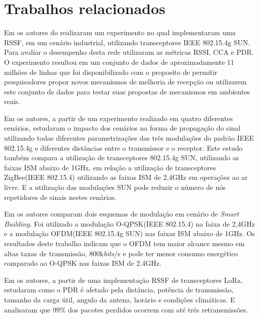 \section{Trabalhos relacionados}
Em \cite{tuset2020dataset} os autores do realizaram um experimento no qual implementaram uma RSSF, em um cenário industrial, utilizando transceptores IEEE 802.15.4g SUN. Para avaliar o desempenho desta rede utilizaram as métricas RSSI, CCA e PDR. O experimento resultou em um conjunto de dados de aproximadamente 11 milhões de linhas que foi disponibilizado com o proposito de permitir pesquisadores propor novos mecanismos  de melhoria de recepção ou utilizarem este conjunto de dados para testar suas propostas de mecanismos em ambientes reais.

Em \cite{munoz2018evaluation} os autores, a partir de um experimento realizado em quatro diferentes cenários, estudaram o impacto dos cenários na forma de propagação do sinal utilizando todas diferentes parametrizações das três modulações do padrão IEEE 802.15.4g e diferentes distâncias entre o transmissor e o receptor. Este estudo também compara a utilização de transceptores 802.15.4g SUN, utilizando as faixas ISM abaixo de 1GHz, em relação a utilização de transceptores ZigBee(IEEE 802.15.4) utilizando as faixas ISM de 2,4GHz em operações ao ar livre. E a utilização das modulações SUN pode reduzir o número de nós repetidores de sinais nestes cenários.

Em  \cite{munoz2018overview} os autores comparam dois esquemas de modulação em cenário de \emph{Smart Building}. Foi utilizado a modulação O-QPSK(IEEE 802.15.4) na faixa de 2,4GHz e a modulação OFDM(IEEE 802.15.4g SUN) nas faixas ISM abaixo de 1GHz. Os resultados deste trabalho indicam que o OFDM tem maior alcance mesmo em altas taxas de transmissão, 800k\emph{bits}/s e pode ter menor consumo energético comparado ao O-QPSK nas faixas ISM de 2.4GHz.

Em \cite{wang2017performance} os autores, a partir de uma implementação RSSF de transceptores LoRa, estudaram como o PDR é afetado pela distância, potência de transmissão, tamanho da carga útil, angulo da antena, horário e condições climáticas. E analisaram que 99\% dos pacotes perdidos ocorrem com até três retransmissões.
